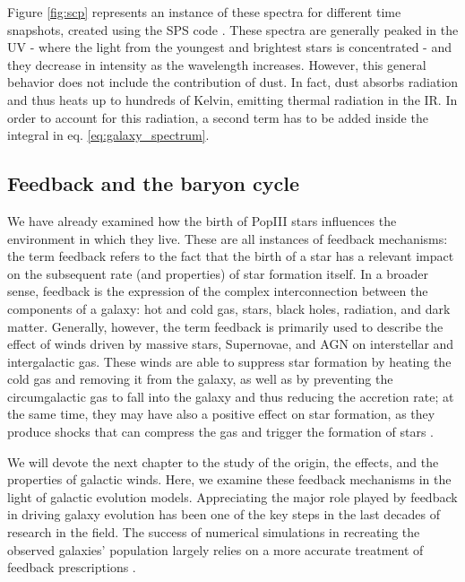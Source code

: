   Figure \ref{fig:scp} represents an instance of these spectra for different time snapshots, created using the SPS code  \citep{leitherer1999}. These spectra are generally peaked in the UV - where the light from the youngest and brightest stars is concentrated - and they decrease in intensity as the wavelength increases. However, this general behavior does not include the contribution of dust. In fact, dust absorbs radiation and thus heats up to hundreds of Kelvin, emitting thermal radiation in the IR. In order to account for this radiation, a second term has to be added inside the integral in eq. \ref{eq:galaxy_spectrum}.
  

  \subsection{Feedback and the baryon cycle} \label{sec:feedback}
  
  
  We have already examined how the birth of PopIII stars influences the environment in which they live. These are all instances of feedback mechanisms: the term feedback refers to the fact that the birth of a star has a relevant impact on the subsequent rate (and properties) of star formation itself. In a broader sense, feedback is the expression of the complex interconnection between the components of a galaxy: hot and cold gas, stars, black holes, radiation, and dark matter. Generally, however, the term feedback is primarily used to describe the effect of winds driven by massive stars, Supernovae, and AGN on interstellar and intergalactic gas. These winds are able to suppress star formation by heating the cold gas and removing it from the galaxy, as well as by preventing the circumgalactic gas to fall into the galaxy and thus reducing the accretion rate; at the same time, they may have also a positive effect on star formation, as they produce shocks that can compress the gas and trigger the formation of stars \citep{silk2009global, ishibashi2012active}.
  
  We will devote the next chapter to the study of the origin, the effects, and the properties of galactic winds. Here, we examine these feedback mechanisms in the light of galactic evolution models. Appreciating the major role played by feedback in driving galaxy evolution has been one of the key steps in the last decades of research in the field. The success of numerical simulations in recreating the observed galaxies' population largely relies on a more accurate treatment of feedback prescriptions \citep{Vogelsberger:2019ynw}.
  

